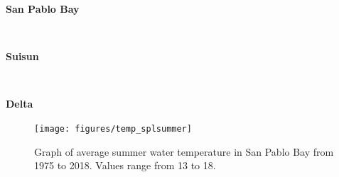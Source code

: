 \documentclass[
]{book}
\begin{document}
\begin{panel-grid}

\begin{columns-nocenter}

\begin{column800}

\textbf{San Pablo Bay}

\end{column800}

\begin{column40}

~

\end{column40}

\begin{column800}

\textbf{Suisun}

\end{column800}

\begin{column40}

~

\end{column40}

\begin{column800}

\textbf{Delta}

\end{column800}

\end{columns-nocenter}

\begin{columns-nocenter}

\begin{column800}

\begin{expand}

\begin{figure}
\texttt{[image: figures/temp\_splsummer]} \caption{Graph of average summer water temperature in San Pablo Bay from 1975 to 2018. Values range from 13 to 18.}\label{fig:unnamed-chunk-57}
\end{figure}

\end{expand}

\end{column800}

\begin{column40}

~

\end{column40}


\end{columns-nocenter}
\end{panel-grid}
\end{document}
